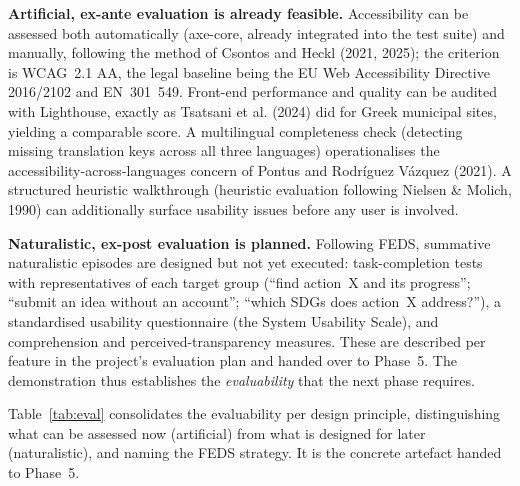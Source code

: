 \documentclass[11pt,a4paper]{article}
\begin{document}
\textbf{Artificial, ex-ante evaluation is already feasible.} Accessibility can be assessed both automatically (axe-core, already integrated into the test suite) and manually, following the method of Csontos and Heckl (2021, 2025); the criterion is WCAG~2.1 AA, the legal baseline being the EU Web Accessibility Directive 2016/2102 and EN~301~549. Front-end performance and quality can be audited with Lighthouse, exactly as Tsatsani et al. (2024) did for Greek municipal sites, yielding a comparable score. A multilingual completeness check (detecting missing translation keys across all three languages) operationalises the accessibility-across-languages concern of Pontus and Rodr\'iguez V\'azquez (2021). A structured heuristic walkthrough (heuristic evaluation following Nielsen \& Molich, 1990) can additionally surface usability issues before any user is involved.

\textbf{Naturalistic, ex-post evaluation is planned.} Following FEDS, summative naturalistic episodes are designed but not yet executed: task-completion tests with representatives of each target group (``find action~X and its progress''; ``submit an idea without an account''; ``which SDGs does action~X address?''), a standardised usability questionnaire (the System Usability Scale), and comprehension and perceived-transparency measures. These are described per feature in the project's evaluation plan and handed over to Phase~5. The demonstration thus establishes the \emph{evaluability} that the next phase requires.

Table~\ref{tab:eval} consolidates the evaluability per design principle, distinguishing what can be assessed now (artificial) from what is designed for later (naturalistic), and naming the FEDS strategy. It is the concrete artefact handed to Phase~5.
\end{document}
